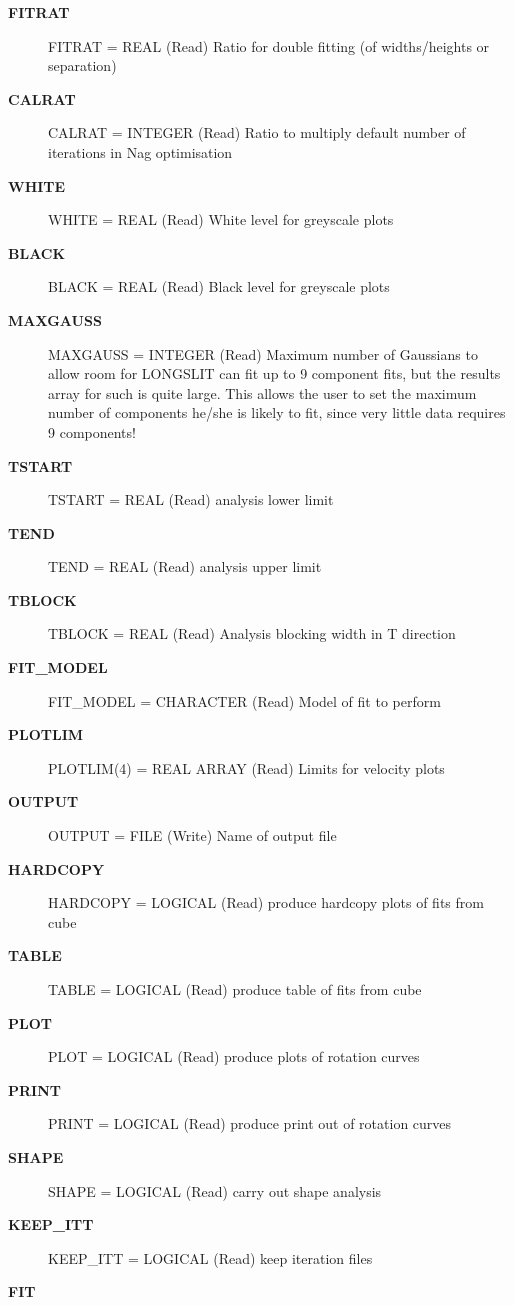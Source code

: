 \begin{description}
\begin{description}
\begin{description}
\item [\textbf{FITRAT}]
   FITRAT = REAL (Read)
        Ratio for double fitting (of widths/heights or separation)
\item [\textbf{CALRAT}]
   CALRAT = INTEGER (Read)
        Ratio to multiply default number of iterations in Nag
                 optimisation
\item [\textbf{WHITE}]
   WHITE = REAL (Read)
        White level for greyscale plots
\item [\textbf{BLACK}]
   BLACK = REAL (Read)
        Black level for greyscale plots
\item [\textbf{MAXGAUSS}]
   MAXGAUSS = INTEGER (Read)
        Maximum number of Gaussians to allow room for
                 LONGSLIT can fit up to 9 component fits, but the results
                 array for such is quite large. This allows the user to set
                 the maximum number of components he/she is likely to fit,
                since very little data requires 9 components!
\item [\textbf{TSTART}]
   TSTART = REAL (Read)
        analysis lower limit
\item [\textbf{TEND}]
   TEND = REAL (Read)
        analysis upper limit
\item [\textbf{TBLOCK}]
   TBLOCK = REAL (Read)
        Analysis blocking width in T direction
\item [\textbf{FIT\_MODEL}]
   FIT\_MODEL = CHARACTER (Read)
        Model of fit to perform
\item [\textbf{PLOTLIM}]
   PLOTLIM(4) = REAL ARRAY (Read)
        Limits for velocity plots
\item [\textbf{OUTPUT}]
   OUTPUT = FILE (Write)
        Name of output file
\item [\textbf{HARDCOPY}]
   HARDCOPY = LOGICAL (Read)
        produce hardcopy plots of fits from cube
\item [\textbf{TABLE}]
   TABLE = LOGICAL (Read)
        produce table of fits from cube
\item [\textbf{PLOT}]
   PLOT = LOGICAL (Read)
        produce plots of rotation curves
\item [\textbf{PRINT}]
   PRINT = LOGICAL (Read)
        produce print out of rotation curves
\item [\textbf{SHAPE}]
   SHAPE = LOGICAL (Read)
        carry out shape analysis
\item [\textbf{KEEP\_ITT}]
   KEEP\_ITT = LOGICAL (Read)
        keep iteration files
\item [\textbf{FIT}]

\end{description}
\end{description}
\end{description}
